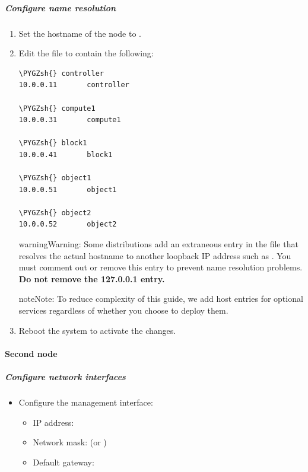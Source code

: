 \documentclass[letterpaper,10pt,english]{sphinxmanual}
\def\PYGZsh{\char`\#}
\begin{document}
\subparagraph{Configure name resolution}
\label{_source/installation_guide/environment-networking-storage-swift:configure-name-resolution}\begin{enumerate}
\item {} 
Set the hostname of the node to .

\item {} 
Edit the  file to contain the following:

\begin{Verbatim}[commandchars=\\\{\}]
\PYGZsh{} controller
10.0.0.11       controller

\PYGZsh{} compute1
10.0.0.31       compute1

\PYGZsh{} block1
10.0.0.41       block1

\PYGZsh{} object1
10.0.0.51       object1

\PYGZsh{} object2
10.0.0.52       object2
\end{Verbatim}

\begin{notice}{warning}{Warning:}
Some distributions add an extraneous entry in the 
file that resolves the actual hostname to another loopback IP
address such as . You must comment out or remove this
entry to prevent name resolution problems. \textbf{Do not remove the
127.0.0.1 entry.}
\end{notice}

\begin{notice}{note}{Note:}
To reduce complexity of this guide, we add host entries for optional
services regardless of whether you choose to deploy them.
\end{notice}

\item {} 
Reboot the system to activate the changes.

\end{enumerate}


\paragraph{Second node}
\label{_source/installation_guide/environment-networking-storage-swift:second-node}

\subparagraph{Configure network interfaces}
\label{_source/installation_guide/environment-networking-storage-swift:id1}\begin{itemize}
\item {} 
Configure the management interface:
\begin{itemize}
\item {} 
IP address: 

\item {} 
Network mask:  (or )

\item {} 
Default gateway: 

\end{itemize}

\end{itemize}
\end{document}
